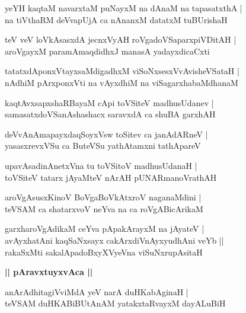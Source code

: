 \documentclass[twoside,12pt,openright]{book}
\newcounter{shloka}[chapter]
\def\uvaca#1{\centerline{{\large\textbf{#1}}}}
\begin{document}
\begin{shloka}%
yeYH kaqtaM navarxtaM puNayxM na dAnaM na tapasatxthA |\\
na tiVthaRM deVvapUjA ca nAnanxM datatxM tuBUrishaH 
\end{shloka}

\begin{shloka}%
teV veV loVkAsasxdA jecnxVyAH roVgadoVSaparxpiVDitAH |\\
aroVgayxM paramAmaqdidhxJ manasA yadayxdicaCxti 
\end{shloka}

\begin{shloka}%
tatatxdAponxVtayxsaMdigadhxM viSoNxsesxVvAvisheVSataH |\\
nAdhiM pArxponxVti na vAyxdhiM na viSagarxhabaMdhanaM 
\end{shloka}

\begin{shloka}%
kaqtAvxsapxshaRBayaM cApi toVSiteV madhusUdanev |\\
samasatxdoVSanAshashacx saravxdA ca shuBA garxhAH
\end{shloka}

\begin{shloka}%
deVvAnAmapayxdaqSoyxVsw toSitev ca janAdARneV |\\
yasasxrevxVSu ca ButeVSu yathAtamxni tathApareV 
\end{shloka}

\begin{shloka}%
upavAsadinAnetxVna tu toVSitoV madhusUdanaH |\\
toVSiteV tatarx jAyaMteV nArAH pUNARmanoVrathAH
\end{shloka}

\begin{shloka}%
aroVgAsusxKinoV BoVgaBoVkAtxroV naganaMdini |\\
teVSAM ca shatarxvoV neYva na ca roVgABicArikaM 
\end{shloka}

\begin{shloka}%
garxharoVgAdikaM ceYva pApakArayxM na jAyateV |\\
avAyxhatAni kaqSaNxsayx cakArxdiVnAyxyudhAni veYb ||\\
rakaSxMti sakalApadoBxyXVyeVna viSuNxrupAsitaH 
\end{shloka}

\uvaca{|| pAravxtuyxvAca ||}

\begin{shloka}%
anArAdhitagiVviMdA yeV narA duHKabAginaH |\\
teVSAM duHKABiBUtAnAM yatakxtaRvayxM dayALuBiH 
\end{shloka}
\end{document}
